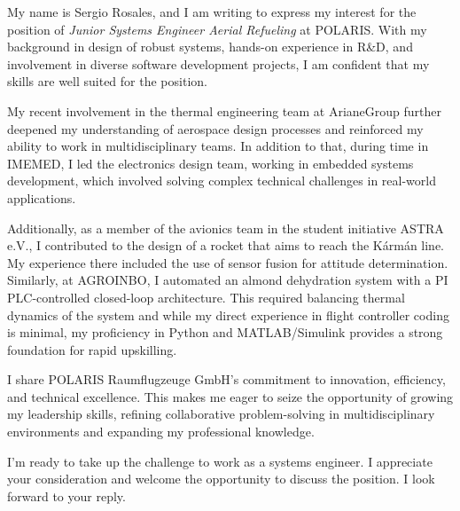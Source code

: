 


\begin{cvletter}
My name is Sergio Rosales, and I am writing to express my interest for
the position of \textit{Junior Systems Engineer Aerial Refueling} at
POLARIS. With my background in design of robust systems, hands-on
experience in R\&D, and involvement in diverse software development
projects, I am confident that my skills are well suited for the
position.

My recent involvement in the thermal engineering team at ArianeGroup
further deepened my understanding of aerospace design processes and
reinforced my ability to work in multidisciplinary teams. In addition
to that, during time in IMEMED, I led the electronics design team,
working in embedded systems development, which involved solving
complex technical challenges in real-world applications.

Additionally, as a member of the avionics team in the student
initiative ASTRA e.V., I contributed to the design of a rocket that
aims to reach the Kármán line. My experience there included the use of
sensor fusion for attitude determination. Similarly, at AGROINBO, I
automated an almond dehydration system with a PI PLC-controlled
closed-loop architecture. This required balancing thermal dynamics of
the system and while my direct experience in flight controller coding
is minimal, my proficiency in Python and MATLAB/Simulink provides a
strong foundation for rapid upskilling.

I share POLARIS Raumflugzeuge GmbH's commitment to innovation,
efficiency, and technical excellence. This makes me eager to seize the
opportunity of growing my leadership skills, refining collaborative
problem-solving in multidisciplinary environments and expanding my
professional knowledge.

I'm ready to take up the challenge to work as a systems engineer. I
appreciate your consideration and welcome the opportunity to discuss
the position.\hfill\break
I look forward to your reply.
\end{cvletter}
